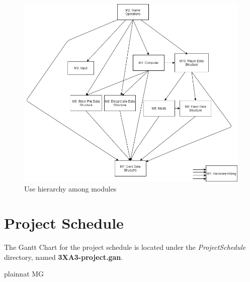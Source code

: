 \documentclass[12pt, titlepage]{article}
\begin{document}
\begin{figure}[H]
    \centering
    \includegraphics[width=\textwidth]{user_hierarchy.jpg}
    \caption{Use hierarchy among modules}
    \label{FigUH}
\end{figure}

\section{Project Schedule}
The Gantt Chart for the project schedule is located under the \textit{ProjectSchedule} directory, named \textbf{3XA3-project.gan}.

 {plainnat}
 {MG}
\end{document}
